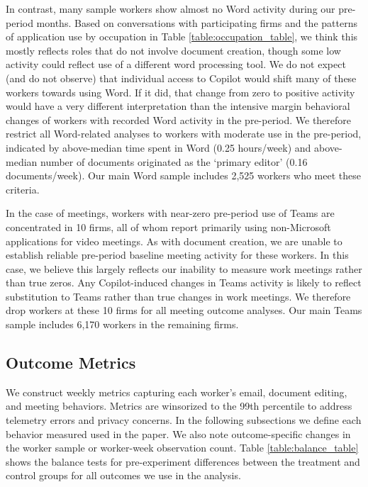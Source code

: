 \documentclass{article}
\begin{document}
In contrast, many sample workers show almost no Word activity during our pre-period months. Based on conversations with participating firms and the patterns of application use by occupation in Table \ref{table:occupation_table}, we think this mostly reflects roles that do not involve document creation, though some low activity could reflect use of a different word processing tool. We do not expect (and do not observe) that individual access to Copilot would shift many of these workers towards using Word. If it did, that change from zero to positive activity would have a very different interpretation than the intensive margin behavioral changes of workers with recorded Word activity in the pre-period. We therefore restrict all Word-related analyses to workers with moderate use in the pre-period, indicated by above-median time spent in Word (0.25 hours/week) and above-median number of documents originated as the `primary editor' (0.16 documents/week). Our main Word sample includes 2,525 workers who meet these criteria. 


In the case of meetings, workers with near-zero pre-period use of Teams are concentrated in 10 firms, all of whom report primarily using non-Microsoft applications for video meetings. As with document creation, we are unable to establish reliable pre-period baseline meeting activity for these workers. In this case, we believe this largely reflects our inability to measure work meetings rather than true zeros. Any Copilot-induced changes in Teams activity is likely to reflect substitution to Teams rather than true changes in work meetings. We therefore drop workers at these 10 firms for all meeting outcome analyses. Our main Teams sample includes 6,170 workers in the remaining firms. 


\subsection{Outcome Metrics\label{app:outcomes}}
We construct weekly metrics capturing each worker's email, document editing, and meeting behaviors. Metrics are winsorized to the 99th percentile to address telemetry errors and privacy concerns. In the following subsections we define each behavior measured used in the paper. We also note outcome-specific changes in the worker sample or worker-week observation count. Table \ref{table:balance_table} shows the balance tests for pre-experiment differences between the treatment and control groups for all outcomes we use in the analysis. 
\end{document}
